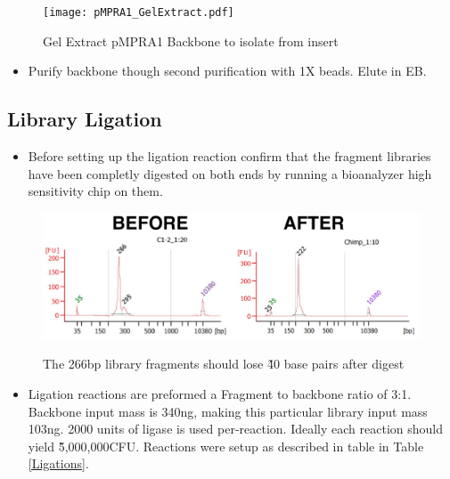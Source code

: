 \documentclass[a4paper]{article}
\begin{document}
        \begin{figure}[H]
			\centering
			\texttt{[image: pMPRA1\_GelExtract.pdf]}
			\label{fig:Gel Extract}
			\caption{Gel Extract pMPRA1 Backbone to isolate from insert}
        \end{figure}
        
        \begin{itemize}
        
            \item Purify backbone though second purification with 1X beads. Elute in EB.
            
        \end{itemize}
	
    \subsection{Library Ligation}
    
    	\begin{itemize}
			
            \item Before setting up the ligation reaction confirm that the fragment libraries have been completly digested on both ends by running a bioanalyzer high sensitivity chip on them. 
            
        \end{itemize}
        
        \begin{figure}[H]
			\centering
			\includegraphics[width=1.0\textwidth]{Frag_Digest.pdf}
			\label{fig:Frag_Digest}
			\caption{The 266bp library fragments should lose \~40 base pairs after digest}
        \end{figure}
        
        \begin{itemize}
        
        \item Ligation reactions are preformed a Fragment to backbone ratio of 3:1. Backbone input mass is 340ng, making this particular library input mass 103ng. 2000 units of ligase is used per-reaction. Ideally each reaction should yield \~5,000,000CFU. Reactions were setup as described in table in Table \ref{Ligations}.
        \end{itemize}
    
\end{document}
